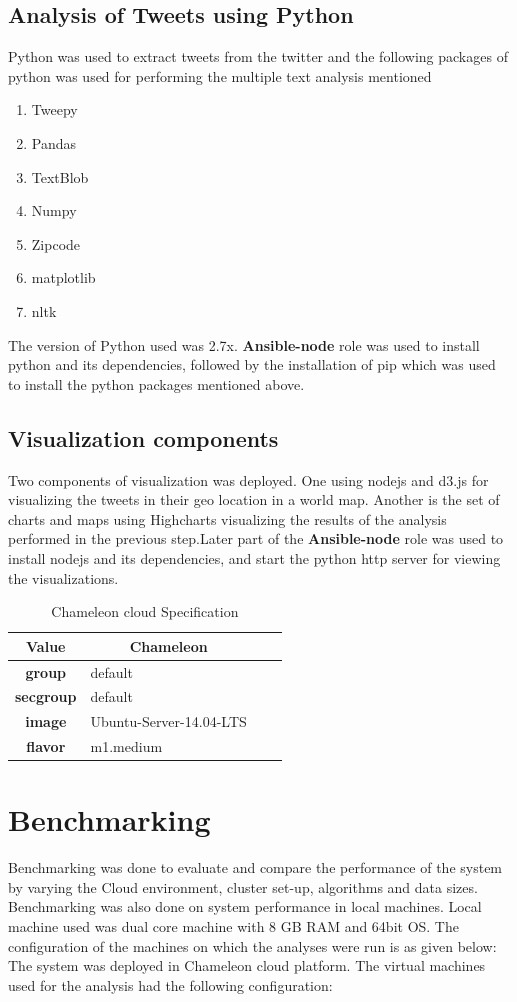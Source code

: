 \documentclass[9pt,twocolumn,twoside]{styles/osajnl}
\begin{document}
\subsection{Analysis of Tweets using Python}
Python was used to extract tweets from the twitter and the following packages of python was used for performing the multiple text analysis mentioned
\begin{enumerate}
    \item Tweepy
\item Pandas
\item TextBlob
\item Numpy
\item Zipcode
\item matplotlib
\item nltk
\end{enumerate}

The version of Python used was 2.7x. \textbf{Ansible-node} role was used to install python and its dependencies, followed by the installation of pip which was used to install the python packages mentioned above.
\subsection{Visualization components}
Two components of visualization was deployed. One using nodejs and d3.js for visualizing the tweets in their geo location in a world map. Another is the set of charts and maps using Highcharts visualizing the results of the analysis performed in the previous step.Later part of the \textbf{Ansible-node} role was used to install nodejs and its dependencies, and start the python http server for viewing the visualizations.  
\begin{table}[htb]
\centering
\caption{Chameleon cloud Specification}
\label{tab-cham}
\begin{tabular}{@{}clll@{}}
\toprule
\textbf{Value}    & \multicolumn{1}{c}{\textbf{Chameleon}} \\ \midrule
\textbf{group}    & default         \\
\textbf{secgroup} & default  \\
\textbf{image}    & Ubuntu-Server-14.04-LTS\\
\textbf{flavor}   & m1.medium    \\ \bottomrule
\end{tabular}
\end{table}
\section{Benchmarking}
Benchmarking was done to evaluate and compare the performance of the system by varying the Cloud environment, cluster set-up, algorithms and data sizes. Benchmarking was also done on system performance in local machines. Local machine used was dual core machine with 8 GB RAM and 64bit OS. The configuration of the machines on which the analyses were run is as given below:
The system was deployed in Chameleon cloud platform. The virtual machines used for the analysis had the following configuration:\\  
\end{document}
